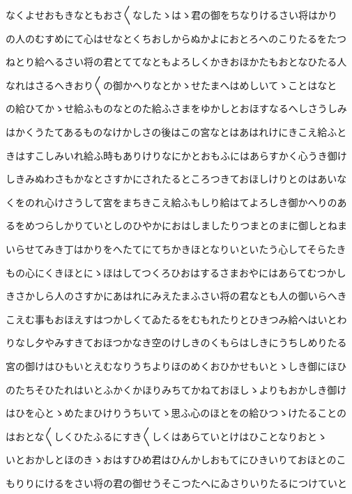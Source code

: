 \documentclass[a4paper,11pt,landscape]{ltjtarticle}
\begin{document}
\par\medskip
なくよせおもきなともおさ〱なしたゝはゝ君の御をちなりけるさい将はかり
\par\medskip
の人のむすめにて心はせなとくちおしからぬかよにおとろへのこりたるをたつ
\par\medskip
ねとり給へるさい将の君とててなともよろしくかきおほかたもおとなひたる人
\par\medskip
なれはさるへきおり〱の御かへりなとかゝせたまへはめしいてゝことはなと
\par\medskip
の給ひてかゝせ給ふものなとのた給ふさまをゆかしとおほすなるへしさうしみ
\par\medskip
はかくうたてあるものなけかしさの後はこの宮なとはあはれけにきこえ給ふと
\par\medskip
きはすこしみいれ給ふ時もありけりなにかとおもふにはあらすかく心うき御け
\par\medskip
しきみぬわさもかなとさすかにされたるところつきておほしけりとのはあいな
\par\medskip
くをのれ心けさうして宮をまちきこえ給ふもしり給はてよろしき御かへりのあ
\par\medskip
るをめつらしかりていとしのひやかにおはしましたりつまとのまに御しとねま
\par\medskip
いらせてみき丁はかりをへたてにてちかきほとなりいといたう心してそらたき
\par\medskip
もの心にくきほとにゝほはしてつくろひおはするさまおやにはあらてむつかし
\par\medskip
きさかしら人のさすかにあはれにみえたまふさい将の君なとも人の御いらへき
\par\medskip
こえむ事もおほえすはつかしくてゐたるをむもれたりとひきつみ給へはいとわ
\par\medskip
りなし夕やみすきておほつかなき空のけしきのくもらはしきにうちしめりたる
\par\medskip
宮の御けはひもいとえむなりうちよりほのめくおひかせもいとゝしき御にほひ
\par\medskip
のたちそひたれはいとふかくかほりみちてかねておほしゝよりもおかしき御け
\par\medskip
はひを心とゝめたまひけりうちいてゝ思ふ心のほとをの給ひつゝけたることの
\par\medskip
はおとな〱しくひたふるにすき〱しくはあらていとけはひことなりおとゝ
\par\medskip
いとおかしとほのきゝおはすひめ君はひんかしおもてにひきいりておほとのこ
\par\medskip
もりりにけるをさい将の君の御せうそこつたへにゐさりいりたるにつけていと
\par\medskip
\end{document}
